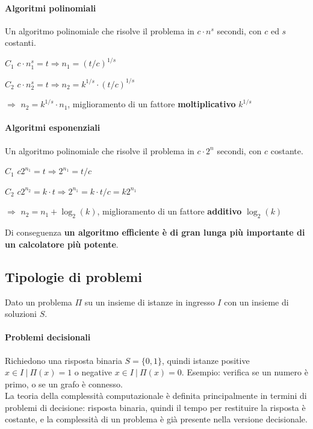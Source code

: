 \documentclass[10pt]{book}
\begin{document}
\paragraph{Algoritmi polinomiali} Un algoritmo polinomiale che risolve il problema in $c\cdot n^s$ secondi, con $c$ ed $s$ costanti.
\begin{list}{}{}
	\item[$C_1$] $c\cdot n_1^s = t \Rightarrow n_1 = (t/c)^{1/s}$
	\item[$C_2$] $c\cdot n_2^s = t \Rightarrow n_2 = k^{1/s}\cdot(t/c)^{1/s}$
	\item[$\Rightarrow$] $n_2 = k^{1/s}\cdot n_1$, miglioramento di un fattore \textbf{moltiplicativo} $k^{1/s}$
\end{list}
\paragraph{Algoritmi esponenziali} Un algoritmo polinomiale che risolve il problema in $c\cdot 2^n$ secondi, con $c$ costante.
\begin{list}{}{}
	\item[$C_1$] $c2^{n_1} = t \Rightarrow 2^{n_1} = t/c$
	\item[$C_2$] $c2^{n_2} = k\cdot t \Rightarrow 2^{n_1} = k\cdot t/c = k2^{n_1}$
	\item[$\Rightarrow$] $n_2 = n_1 + \log_2(k)$, miglioramento di un fattore \textbf{additivo} $\log_2(k)$
\end{list}
Di conseguenza \textbf{un algoritmo efficiente è di gran lunga più importante di un calcolatore più potente}.
\subsection{Tipologie di problemi}
Dato un problema $\Pi$ su un insieme di istanze in ingresso $I$ con un insieme di soluzioni $S$.
\paragraph{Problemi decisionali} Richiedono una risposta binaria $S=\{0, 1\}$, quindi istanze positive $x\in I\:|\:\Pi(x) = 1$ o negative $x\in I\:|\:\Pi(x) = 0$. Esempio: verifica se un numero è primo, o se un grafo è connesso.\\
La teoria della complessità computazionale è definita principalmente in termini di problemi di decisione: risposta binaria, quindi il tempo per restituire la risposta è costante, e la complessità di un problema è già presente nella versione decisionale.
\end{document}
